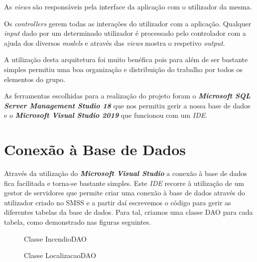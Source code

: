\documentclass[a4paper,12pt]{scrreprt}
\newcommand{\tab}{
    \hspace{1cm}}
\begin{document}
\tab As \textit{views} são responsáveis pela interface da aplicação com o utilizador da mesma.

\tab Os \textit{controllers} gerem todas as interações do utilizador com a aplicação. Qualquer \textit{input} dado por um determinado utilizador é processado pelo controlador com a ajuda dos diversos \textit{models} e através das \textit{views} mostra o respetivo \textit{output}.

\tab A utilização desta arquitetura foi muito benéfica pois para além de ser bastante simples permitiu uma boa organização e distribuição do trabalho por todos os elementos do grupo.

\tab As ferramentas escolhidas para a realização do projeto foram o \textbf{\textit{Microsoft SQL Server Management Studio 18}} que nos permitiu gerir a nossa base de dados e o \textbf{\textit{Microsoft Visual Studio 2019}} que funcionou com um \textit{IDE}.

\clearpage

\section{Conexão à Base de Dados}

\tab Através da utilização do \textbf{\textit{Microsoft Visual Studio}} a conexão à base de dados fica facilitada e torna-se bastante simples. Este \textit{IDE} recorre à utilização de um gestor de servidores que permite criar uma conexão à base de dados através do utilizador criado no SMSS e a partir daí escrevemos o código para gerir as diferentes tabelas da base de dados. Para tal, criamos uma classe DAO para cada tabela, como demonstrado nas figuras seguintes.

\begin{figure}[H]
    \centering
    \caption{Classe IncendioDAO}
\end{figure}

\begin{figure}[H]
    \centering
    \caption{Classe LocalizacaoDAO}
\end{figure}
\end{document}
